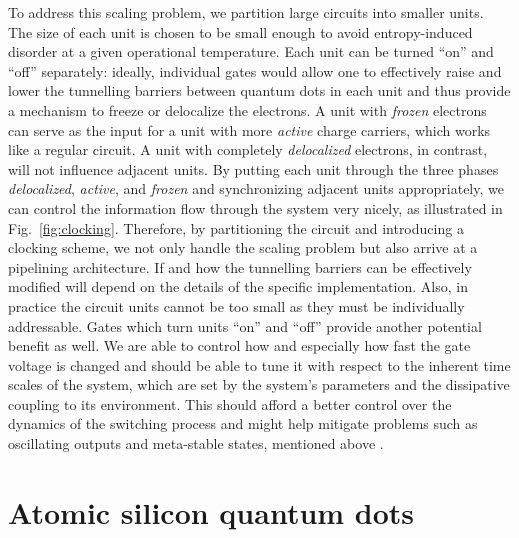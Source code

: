 To address this scaling problem, we partition large circuits into smaller units.
The size of each unit is chosen to be small enough to avoid entropy-induced
disorder at a given operational temperature. Each unit can be turned ``on'' and
``off'' separately: ideally, individual gates would allow one to effectively
raise and lower the tunnelling barriers between quantum dots in each unit and
thus provide a mechanism to freeze or delocalize the electrons. A unit with
\emph{frozen} electrons can serve as the input for a unit with more
\emph{active} charge carriers, which works like a regular  circuit. A
unit with completely \emph{delocalized} electrons, in contrast, will not
influence adjacent units. By putting each unit through the three phases
\emph{delocalized}, \emph{active}, and \emph{frozen} and synchronizing adjacent
units appropriately, we can control the information flow through the system very
nicely, as illustrated in Fig.~\ref{fig:clocking}. Therefore, by partitioning
the circuit and introducing a clocking scheme, we not only handle the scaling
problem but also arrive at a pipelining architecture. If and how the tunnelling
barriers can be effectively modified will depend on the details of the specific
 implementation. Also, in practice the  circuit units cannot
be too small as they must be individually addressable. Gates which turn
 units ``on'' and ``off'' provide another potential benefit as well.
We are able to control how and especially how fast the gate voltage is changed
and should be able to tune it with respect to the inherent time scales of the
 system, which are set by the system's parameters and the dissipative
coupling to its environment. This should afford a better control over the
dynamics of the switching process and might help mitigate problems such as
oscillating outputs and meta-stable states, mentioned above
\cite{lent1997device}.


\section{Atomic silicon quantum dots}
\label{sec:atomic_silicon_quantum_dots}


